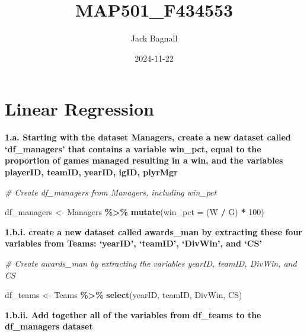 \documentclass[
]{article}
\title{MAP501\_F434553}
\author{Jack Bagnall}
\date{2024-11-22}
\newenvironment{Shaded}{\begin{snugshade}}{\end{snugshade}}
\newcommand{\AttributeTok}[1]{\textcolor[rgb]{0.13,0.29,0.53}{#1}}
\newcommand{\CommentTok}[1]{\textcolor[rgb]{0.56,0.35,0.01}{\textit{#1}}}
\newcommand{\DecValTok}[1]{\textcolor[rgb]{0.00,0.00,0.81}{#1}}
\newcommand{\FunctionTok}[1]{\textcolor[rgb]{0.13,0.29,0.53}{\textbf{#1}}}
\newcommand{\NormalTok}[1]{#1}
\newcommand{\OtherTok}[1]{\textcolor[rgb]{0.56,0.35,0.01}{#1}}
\newcommand{\SpecialCharTok}[1]{\textcolor[rgb]{0.81,0.36,0.00}{\textbf{#1}}}
\begin{document}
\maketitle

\section{Linear Regression}\label{linear-regression}

\textbf{1.a. Starting with the dataset Managers, create a new dataset
called `df\_managers' that contains a variable win\_pct, equal to the
proportion of games managed resulting in a win, and the variables
playerID, teamID, yearID, igID, plyrMgr}

\begin{Shaded}
\begin{Highlighting}[]
\CommentTok{\# Create df\_managers from Managers, including win\_pct}

\NormalTok{df\_managers }\OtherTok{\textless{}{-}}\NormalTok{ Managers }\SpecialCharTok{\%\textgreater{}\%} \FunctionTok{mutate}\NormalTok{(}\AttributeTok{win\_pct =}\NormalTok{ (W }\SpecialCharTok{/}\NormalTok{ G) }\SpecialCharTok{*} \DecValTok{100}\NormalTok{)}
\end{Highlighting}
\end{Shaded}

\textbf{1.b.i. create a new dataset called awards\_man by extracting
these four variables from Teams: `yearID', `teamID', `DivWin', and `CS'}

\begin{Shaded}
\begin{Highlighting}[]
\CommentTok{\# Create awards\_man by extracting the variables \textquotesingle{}yearID\textquotesingle{}, \textquotesingle{}teamID\textquotesingle{}, \textquotesingle{}DivWin\textquotesingle{}, and \textquotesingle{}CS\textquotesingle{}}

\NormalTok{df\_teams }\OtherTok{\textless{}{-}}\NormalTok{ Teams }\SpecialCharTok{\%\textgreater{}\%} \FunctionTok{select}\NormalTok{(yearID, teamID, DivWin, CS)}
\end{Highlighting}
\end{Shaded}

\textbf{1.b.ii. Add together all of the variables from df\_teams to the
df\_managers dataset}
\end{document}
